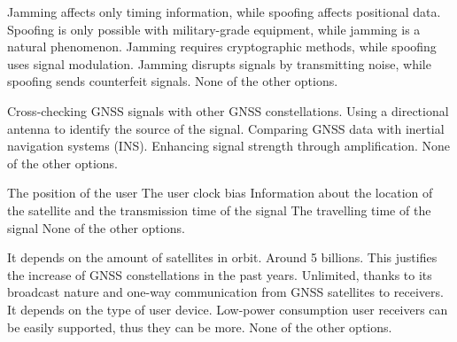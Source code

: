 \begin{checkboxes}
    \choice Jamming affects only timing information, while spoofing affects positional data.
    \choice Spoofing is only possible with military-grade equipment, while jamming is a natural phenomenon.
    \choice Jamming requires cryptographic methods, while spoofing uses signal modulation.
    \CorrectChoice Jamming disrupts signals by transmitting noise, while spoofing sends counterfeit signals.
    \choice None of the other options.
\end{checkboxes}

\begin{checkboxes}
    \CorrectChoice Cross-checking GNSS signals with other GNSS constellations.
    \CorrectChoice Using a directional antenna to identify the source of the signal.
    \CorrectChoice Comparing GNSS data with inertial navigation systems (INS).
    \choice Enhancing signal strength through amplification.
    \choice None of the other options.
\end{checkboxes}

\begin{checkboxes}
    \choice The position of the user
    \choice The user clock bias
    \CorrectChoice Information about the location of the satellite and the transmission time of the signal
    \choice The travelling time of the signal
    \choice None of the other options.
\end{checkboxes}

\begin{checkboxes}
    \choice It depends on the amount of satellites in orbit.
    \choice Around 5 billions. This justifies the increase of GNSS constellations in the past years.
    \CorrectChoice Unlimited, thanks to its broadcast nature and one-way communication from GNSS satellites to receivers.
    \choice It depends on the type of user device. Low-power consumption user receivers can be easily supported, thus they can be more.
    \choice None of the other options.
\end{checkboxes}

